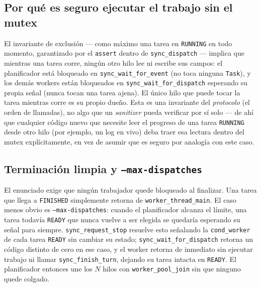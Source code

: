 \subsection{Por qué es seguro ejecutar el trabajo sin el mutex}
\label{sec:invariante}

El invariante de exclusión --- como máximo una tarea en \texttt{RUNNING} en
todo momento, garantizado por el \texttt{assert} dentro de
\texttt{sync\_dispatch} --- implica que mientras una tarea corre, ningún
otro hilo lee ni escribe sus campos: el planificador está bloqueado en
\texttt{sync\_wait\_for\_event} (no toca ninguna \texttt{Task}), y los demás
workers están bloqueados en \texttt{sync\_wait\_for\_dispatch} esperando su
propia señal (nunca tocan una tarea ajena). El único hilo que puede tocar la
tarea mientras corre es su propio dueño. Esta es una invariante del
\emph{protocolo} (el orden de llamadas), no algo que un \textit{sanitizer}
pueda verificar por sí solo --- de ahí que cualquier código nuevo que
necesite leer el progreso de una tarea \texttt{RUNNING} desde otro hilo (por
ejemplo, un log en vivo) deba traer esa lectura dentro del mutex
explícitamente, en vez de asumir que es seguro por analogía con este caso.

\subsection{Terminación limpia y \texttt{--max-dispatches}}

El enunciado exige que ningún trabajador quede bloqueado al finalizar. Una
tarea que llega a \texttt{FINISHED} simplemente retorna de
\texttt{worker\_thread\_main}. El caso menos obvio es
\texttt{--max-dispatches}: cuando el planificador alcanza el límite, una
tarea todavía \texttt{READY} que nunca vuelve a ser elegida se quedaría
esperando su señal para siempre. \texttt{sync\_request\_stop} resuelve esto
señalando la \texttt{cond\_worker} de cada tarea \texttt{READY} sin cambiar
su estado; \texttt{sync\_wait\_for\_dispatch} retorna un código distinto de
cero en ese caso, y el worker retorna de inmediato sin ejecutar trabajo ni
llamar \texttt{sync\_finish\_turn}, dejando su tarea intacta en
\texttt{READY}. El planificador entonces une los $N$ hilos con
\texttt{worker\_pool\_join} sin que ninguno quede colgado.
